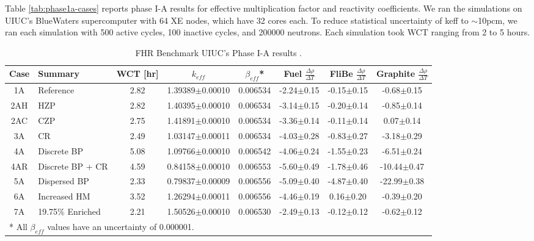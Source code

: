 Table \ref{tab:phase1a-cases} reports phase I-A results for effective multiplication 
factor and reactivity coefficients. 
We ran the simulations on \gls{UIUC}'s BlueWaters supercomputer \cite{ncsa_about_2017}
with 64 XE nodes, which have 32 cores each. 
To reduce statistical uncertainty of keff to $\sim$10pcm, we ran each simulation 
with 500 active cycles, 100 inactive cycles, and 200000 neutrons. 
Each simulation took \gls{WCT} ranging from 2 to 5 hours. 
\begin{table}[H]
    \centering
    \onehalfspacing
    \caption{\gls{FHR} Benchmark UIUC's Phase I-A results \cite{chee_arfcfhr-benchmark_2021}.}
	\label{tab:phase1a-results}
    \footnotesize
    \begin{tabular}{cp{2.7cm}cccccc}
    \hline
    \textbf{Case} & \textbf{Summary} & \textbf{WCT [hr]} & \textbf{$k_{eff}$} & 
    \textbf{$\beta_{eff}$}* & 
    \textbf{Fuel} $\frac{\Delta \rho}{\Delta T}$ & 
    \textbf{FliBe} $\frac{\Delta \rho}{\Delta T}$ & 
    \textbf{Graphite} $\frac{\Delta \rho}{\Delta T}$\\
    \hline 
    1A & Reference &2.82&1.39389$\pm$0.00010 & 0.006534 & -2.24$\pm$0.15 & -0.15$\pm$0.15 & -0.68$\pm$0.15\\
    2AH & \gls{HZP} &2.82&1.40395$\pm$0.00010 & 0.006534 & -3.14$\pm$0.15 & -0.20$\pm$0.14 & -0.85$\pm$0.14\\
    2AC & \gls{CZP} &2.75&1.41891$\pm$0.00010 & 0.006534 & -3.36$\pm$0.14 & -0.11$\pm$0.14 & 0.07$\pm$0.14\\
    3A & \gls{CR} &2.49&1.03147$\pm$0.00011 & 0.006534 & -4.03$\pm$0.28 & -0.83$\pm$0.27 & -3.18$\pm$0.29\\
    4A & Discrete \gls{BP} &5.08&1.09766$\pm$0.00010 & 0.006542 & -4.06$\pm$0.24 & -1.55$\pm$0.23 & -6.51$\pm$0.24\\
    4AR & Discrete \gls{BP} + \gls{CR} &4.59&0.84158$\pm$0.00010 & 0.006553 & -5.60$\pm$0.49 & -1.78$\pm$0.46 & -10.44$\pm$0.47\\
    5A & Dispersed \gls{BP} &2.33&0.79837$\pm$0.00009 & 0.006556 & -5.09$\pm$0.40 & -4.87$\pm$0.40 & -22.99$\pm$0.38\\
    6A & Increased \gls{HM} &3.52&1.26294$\pm$0.00011 & 0.006556 & -4.46$\pm$0.19 & 0.16$\pm$0.20 & -0.39$\pm$0.20\\
    7A & 19.75\% Enriched &2.21&1.50526$\pm$0.00010 & 0.006530 & -2.49$\pm$0.13 & -0.12$\pm$0.12 & -0.62$\pm$0.12\\
    \hline
    \multicolumn{5}{l}{* All $\beta_{eff}$ values have an uncertainty of 0.000001.} 
    \end{tabular}
\end{table}

